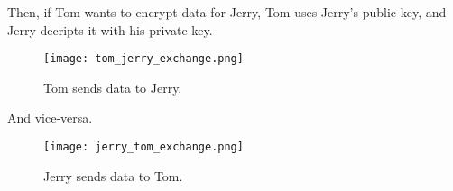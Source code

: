 \documentclass[../main.tex]{subfiles}
\begin{document}
Then, if Tom wants to encrypt data for Jerry, Tom uses Jerry's public key, and Jerry decripts it with his private key.

\begin{figure}[H]
    \centering
    \texttt{[image: tom\_jerry\_exchange.png]}
    \caption{Tom sends data to Jerry.}
    \label{fig:tom_jerry_exchange}
\end{figure}

And vice-versa.

\begin{figure}[H]
    \centering
    \texttt{[image: jerry\_tom\_exchange.png]}
    \caption{Jerry sends data to Tom.}
    \label{fig:jerry_tom_exchange}
\end{figure}
\end{document}
